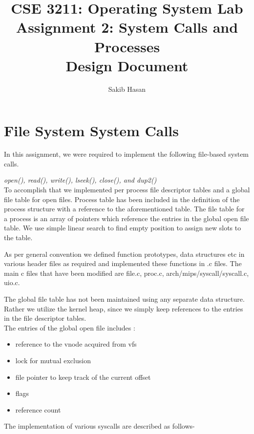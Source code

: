 \documentclass[11pt, english]{article}
\title{CSE 3211: Operating System Lab \\ Assignment 2: System Calls and
Processes \\ Design Document } %
\author{Sakib Hasan\\
}
\date{}
\begin{document}
\maketitle


\section{File System System Calls}

In this assignment, we were required to implement the following file-based system calls.

\emph{open(), read(), write(), lseek(), close(), and dup2()}
\\

To accomplish that we implemented per process file descriptor tables and a global file table for open files. Process table has been included in the definition of the process structure with a reference to the aforementioned table. The file table for a process is an array of pointers which reference the entries in the global open file table. We use simple linear search to find empty position to assign new slots to the table. 

As per general convention we defined function prototypes, data structures etc in various header files as required and implemented these functions in .c files. The main c files that have been modified are file.c, proc.c, arch/mips/syscall/syscall.c, uio.c.

The global file table has not been maintained using any separate data structure. Rather we utilize the kernel heap, since we simply keep references to the entries in the file descriptor tables.
\\

The entries of the global open file includes :
\begin{itemize}
\item reference to the vnode acquired from vfs
\item lock for mutual exclusion
\item file pointer to keep track of the current offset
\item flags
\item reference count
\end{itemize}


The implementation of various syscalls are described as follows-
\end{document}
